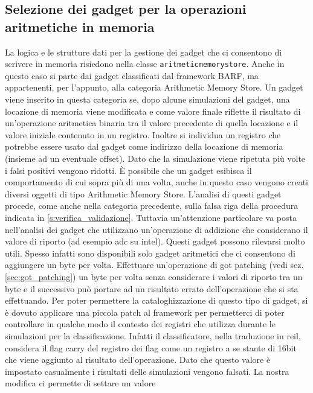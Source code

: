 \subsection{Selezione dei gadget per la operazioni aritmetiche in
  memoria}
\label{sec:arithmeticstore}

La logica e le strutture dati per la gestione dei gadget che ci
consentono di scrivere in memoria risiedono nella classe
\lstinline{aritmeticmemorystore}. Anche in questo caso si parte dai
gadget classificati dal framework BARF, ma appartenenti, per
l'appunto, alla categoria Arithmetic Memory Store. Un gadget viene
inserito in questa categoria se, dopo alcune simulazioni del gadget,
una locazione di memoria viene modificata e come valore finale
riflette il risultato di un'operazione aritmetica binaria tra il
valore precedente di quella locazione e il valore iniziale contenuto
in un registro. Inoltre si individua un registro che potrebbe essere
usato dal gadget come indirizzo della locazione di memoria (insieme ad
un eventuale offset). Dato che la simulazione viene ripetuta più volte
i falsi positivi vengono ridotti. È possibile che un gadget esibisca
il comportamento di cui sopra più di una volta, anche in questo caso
vengono creati diversi oggetti di tipo Arithmetic Memory
Store. L'analisi di questi gadget procede, come anche nella categoria
precedente, sulla falsa riga della procedura indicata in
\ref{s:verifica_validazione}. Tuttavia un'attenzione particolare va
posta nell'analisi dei gadget che utilizzano un'operazione di
addizione che considerano il valore di riporto (ad esempio adc su
intel). Questi gadget possono rilevarsi molto utili. Spesso infatti
sono disponibili solo gadget aritmetici che ci consentono di
aggiungere un byte per volta. Effettuare un'operazione di got patching
(vedi sez. \ref{sec:got_patching}) un byte per volta senza considerare
i valori di riporto tra un byte e il successivo può portare ad un
risultato errato dell'operazione che si sta effettuando. Per poter
permettere la cataloghizzazione di questo tipo di gadget, si è dovuto
applicare una piccola patch al framework per permetterci di poter
controllare in qualche modo il contesto dei registri che utilizza
durante le simulazioni per la classificazione. Infatti il
classificatore, nella traduzione in reil, considera il flag carry del
registro dei flag come un registro a se stante di 16bit che viene
aggiunto al risultato dell'operazione. Dato che questo valore è
impostato casualmente i risultati delle simulazioni vengono
falsati. La nostra modifica ci permette di settare un valore
